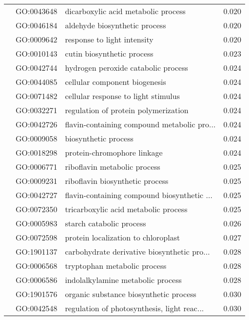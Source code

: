 \begin{longtable}{lllr}
   & GO:0043648 &          dicarboxylic acid metabolic process &         0.020 \\
   & GO:0046184 &                aldehyde biosynthetic process &         0.020 \\
   & GO:0009642 &                  response to light intensity &         0.020 \\
   & GO:0010143 &                   cutin biosynthetic process &         0.023 \\
   & GO:0042744 &          hydrogen peroxide catabolic process &         0.024 \\
   & GO:0044085 &                cellular component biogenesis &         0.024 \\
   & GO:0071482 &          cellular response to light stimulus &         0.024 \\
   & GO:0032271 &         regulation of protein polymerization &         0.024 \\
   & GO:0042726 &  flavin-containing compound metabolic pro... &         0.024 \\
   & GO:0009058 &                         biosynthetic process &         0.024 \\
   & GO:0018298 &                  protein-chromophore linkage &         0.024 \\
   & GO:0006771 &                 riboflavin metabolic process &         0.025 \\
   & GO:0009231 &              riboflavin biosynthetic process &         0.025 \\
   & GO:0042727 &  flavin-containing compound biosynthetic ... &         0.025 \\
   & GO:0072350 &         tricarboxylic acid metabolic process &         0.025 \\
   & GO:0005983 &                     starch catabolic process &         0.026 \\
   & GO:0072598 &          protein localization to chloroplast &         0.027 \\
   & GO:1901137 &  carbohydrate derivative biosynthetic pro... &         0.028 \\
   & GO:0006568 &                 tryptophan metabolic process &         0.028 \\
   & GO:0006586 &            indolalkylamine metabolic process &         0.028 \\
   & GO:1901576 &       organic substance biosynthetic process &         0.030 \\
   & GO:0042548 &  regulation of photosynthesis, light reac... &         0.030 \\

\end{longtable}
